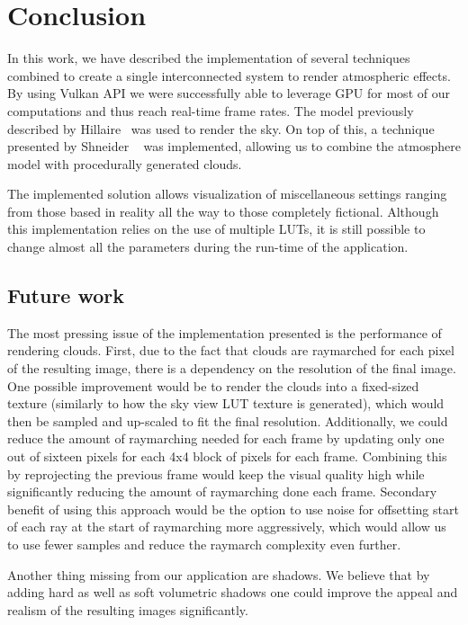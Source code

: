 \documentclass{ctuthesis}
\begin{document}
\chapter{Conclusion}
In this work, we have described the implementation of several techniques combined to create a single 
interconnected system to render atmospheric effects. By using Vulkan API we were successfully able to 
leverage GPU for most of our computations and thus reach real-time frame rates. The model previously described
by Hillaire~\cite{hillaire_2020} was used to render the sky. On top of this, a technique presented by Shneider
~\cite{schneider2015real} was implemented, allowing us to combine the atmosphere model with procedurally generated
clouds. 

The implemented solution allows visualization of miscellaneous settings ranging from those based in reality
all the way to those completely fictional. Although this implementation relies on the use of multiple LUTs, it is 
still possible to change almost all the parameters during the run-time of the application. 

\section{Future work}
The most pressing issue of the implementation presented is the performance of rendering clouds. First, due to the fact
that clouds are raymarched for each pixel of the resulting image, there is a dependency on the resolution of the final 
image. One possible improvement would be to render the clouds into a fixed-sized texture (similarly to how the sky view LUT
texture is generated), which would then be sampled and up-scaled to fit the final resolution. Additionally, we could reduce 
the amount of raymarching needed for each frame by updating only one out of sixteen pixels for each 4x4 block of pixels for
each frame. Combining this by reprojecting the previous frame would keep the visual quality high while significantly reducing
the amount of raymarching done each frame. Secondary benefit of using this approach would be the option to use noise for offsetting
start of each ray at the start of raymarching more aggressively, which would allow us to use fewer samples and reduce the 
raymarch complexity even further.

Another thing missing from our application are shadows. We believe that by adding hard as well as soft volumetric shadows
one could improve the appeal and realism of the resulting images significantly. 
\end{document}
